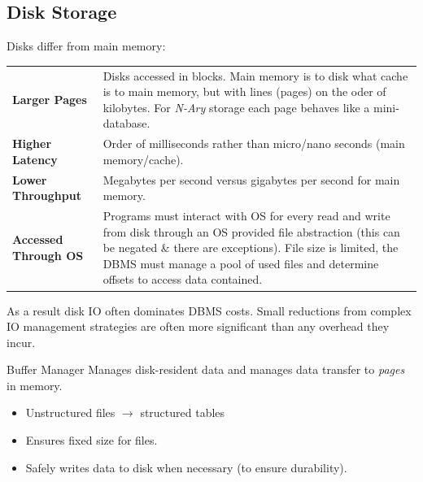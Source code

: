 \subsection{Disk Storage}
Disks differ from main memory:
\begin{center}
    \begin{tabular}{l p{}}
        \textbf{Larger Pages}        & Disks accessed in blocks. Main memory is to disk what cache is to main memory, but with lines (pages) on the oder of kilobytes. For \textit{N-Ary} storage each page behaves like a mini-database.                                                                       \\
        \textbf{Higher Latency}      & Order of milliseconds rather than micro/nano seconds (main memory/cache).                                                                                                                                                                                                \\
        \textbf{Lower Throughput}    & Megabytes per second versus gigabytes per second for main memory.                                                                                                                                                                                                        \\
        \textbf{Accessed Through OS} & Programs must interact with OS for every read and write from disk through an OS provided file abstraction (this can be negated \& there are exceptions). File size is limited, the DBMS must manage a pool of used files and determine offsets to access data contained. \\
    \end{tabular}
\end{center}
As a result disk IO often dominates DBMS costs. Small reductions from complex IO management strategies are often more significant than any overhead they incur.


\begin{definitionbox}{Buffer Manager}
    Manages disk-resident data and manages data transfer to \textit{pages} in memory.
    \begin{itemize}
        \item Unstructured files $\to$ structured tables
        \item Ensures fixed size for files.
        \item Safely writes data to disk when necessary (to ensure durability).
    \end{itemize}
\end{definitionbox}

